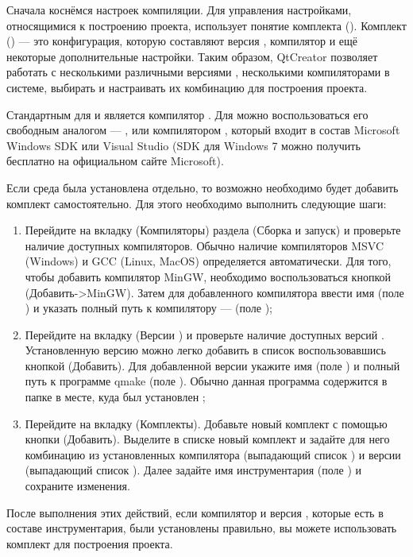 Сначала коснёмся настроек компиляции. Для управления настройками, относящимися к построению проекта, 
 использует понятие комплекта (). Комплект () --- это конфигурация, 
которую составляют версия , компилятор и ещё
некоторые дополнительные настройки. Таким образом, QtCreator позволяет работать с несколькими различными версиями ,
несколькими компиляторами в системе, выбирать и настраивать их комбинацию для построения проекта.

Стандартным для  и  является компилятор . Для  можно воспользоваться его свободным
аналогом --- , или компилятором , который входит в состав Microsoft Windows SDK или Visual Studio (SDK для Windows 7 можно получить бесплатно на официальном сайте Microsoft).

Если среда  была установлена отдельно, то возможно
необходимо будет добавить комплект самостоятельно. Для
этого необходимо выполнить следующие шаги:

\begin{enumerate}
\item Перейдите на вкладку  (Компиляторы) раздела 
(Сборка и запуск) и проверьте наличие доступных компиляторов. Обычно
наличие компиляторов MSVC (Windows) и GCC (Linux, MacOS) определяется автоматически. Для того, чтобы добавить
компилятор MinGW, необходимо воспользоваться кнопкой
(Добавить->MinGW).
Затем для добавленного компилятора ввести имя (поле ) и указать полный путь к
компилятору  ---  (поле );
\item Перейдите на вкладку  (Версии ) и проверьте наличие доступных
версий . Установленную версию можно легко добавить в список воспользовавшись кнопкой
(Добавить). Для добавленной версии укажите имя
(поле ) и полный путь к программе qmake 
(поле ). Обычно
данная программа содержится в папке  в месте, куда был установлен ;
\item Перейдите на вкладку  (Комплекты). Добавьте новый комплект
с помощью кнопки  (Добавить).
Выделите в списке новый комплект и задайте для него комбинацию из
установленных компилятора (выпадающий список ) и версии 
(выпадающий список ). Далее задайте имя инструментария (поле ) и сохраните изменения.
\end{enumerate}
После выполнения этих действий, если компилятор и версия , которые есть в составе инструментария, были
установлены правильно, вы можете использовать комплект для построения проекта.

